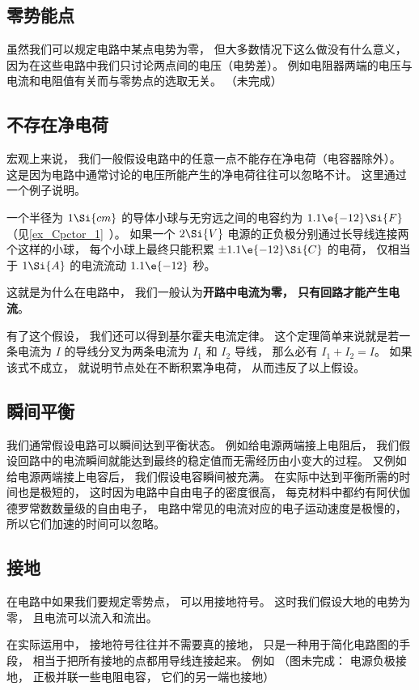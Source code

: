 
\begin{issues}
\issueDraft
\end{issues}


\subsection{零势能点}
虽然我们可以规定电路中某点电势为零， 但大多数情况下这么做没有什么意义， 因为在这些电路中我们只讨论两点间的电压（电势差）。 例如电阻器两端的电压与电流和电阻值有关而与零势点的选取无关。
（未完成）

\subsection{不存在净电荷}
宏观上来说， 我们一般假设电路中的任意一点不能存在净电荷（电容器除外）。 这是因为电路中通常讨论的电压所能产生的净电荷往往可以忽略不计。 这里通过一个例子说明。

\begin{example}{}
一个半径为 $1\Si{cm}$ 的导体小球与无穷远之间的电容约为 $1.1\e{-12} \Si{F}$（见\autoref{ex_Cpctor_1}~）。 如果一个 $2\Si{V}$ 电源的正负极分别通过长导线连接两个这样的小球， 每个小球上最终只能积累 $\pm 1.1\e{-12} \Si{C}$ 的电荷， 仅相当于 $1\Si{A}$ 的电流流动 $1.1\e{-12}$ 秒。
\end{example}
这就是为什么在电路中， 我们一般认为\textbf{开路中电流为零， 只有回路才能产生电流}。

有了这个假设， 我们还可以得到基尔霍夫电流定律。 这个定理简单来说就是若一条电流为 $I$ 的导线分叉为两条电流为 $I_1$ 和 $I_2$ 导线， 那么必有 $I_1 + I_2 = I$。 如果该式不成立， 就说明节点处在不断积累净电荷， 从而违反了以上假设。

\subsection{瞬间平衡}
我们通常假设电路可以瞬间达到平衡状态。 例如给电源两端接上电阻后， 我们假设回路中的电流瞬间就能达到最终的稳定值而无需经历由小变大的过程。 又例如给电源两端接上电容后， 我们假设电容瞬间被充满。 在实际中达到平衡所需的时间也是极短的， 这时因为电路中自由电子的密度很高， 每克材料中都约有阿伏伽德罗常数数量级的自由电子， 电路中常见的电流对应的电子运动速度是极慢的， 所以它们加速的时间可以忽略。

\subsection{接地}
在电路中如果我们要规定零势点， 可以用接地符号。 这时我们假设大地的电势为零， 且电流可以流入和流出。

在实际运用中， 接地符号往往并不需要真的接地， 只是一种用于简化电路图的手段， 相当于把所有接地的点都用导线连接起来。 例如
（图未完成： 电源负极接地， 正极并联一些电阻电容， 它们的另一端也接地）
